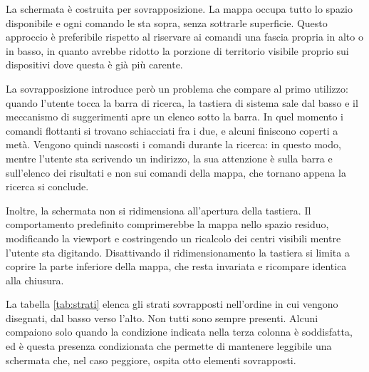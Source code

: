 La schermata è costruita per sovrapposizione.
La mappa occupa tutto lo spazio disponibile e ogni comando le sta sopra, senza sottrarle superficie.
Questo approccio è preferibile rispetto al riservare ai comandi una fascia propria in alto o in basso, in quanto avrebbe
ridotto la porzione di territorio visibile proprio sui dispositivi dove questa è già più carente.

La sovrapposizione introduce però un problema che compare al primo utilizzo: quando
l'utente tocca la barra di ricerca, la tastiera di sistema sale dal basso e il meccanismo di suggerimenti apre un elenco sotto la barra.
In quel momento i comandi flottanti si trovano schiacciati fra i due, e alcuni finiscono coperti a metà.
Vengono quindi nascosti i comandi durante la ricerca: in questo modo, mentre l'utente sta scrivendo un indirizzo,
la sua attenzione è sulla barra e sull'elenco dei risultati e non sui comandi della mappa, che tornano appena la
ricerca si conclude.


Inoltre, la schermata non si ridimensiona all'apertura della tastiera.
Il comportamento predefinito comprimerebbe la mappa nello spazio residuo, modificando la viewport e costringendo un ricalcolo
dei centri visibili mentre l'utente sta digitando.
Disattivando il ridimensionamento la tastiera si limita a coprire la parte inferiore della mappa, che resta invariata e ricompare
identica alla chiusura.

La tabella \ref{tab:strati} elenca gli strati sovrapposti nell'ordine in cui vengono disegnati, dal basso verso l'alto.
Non tutti sono sempre presenti.
Alcuni compaiono solo quando la condizione indicata nella terza colonna è soddisfatta, ed è
questa presenza condizionata che permette di mantenere leggibile una schermata che, nel caso peggiore, ospita otto elementi
sovrapposti.

